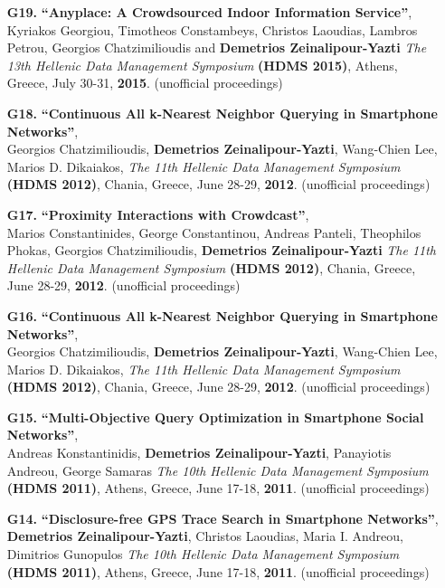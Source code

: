\documentclass[10pt]{article}
\begin{document}
\begin{enumerate}
\item[{\bf G19.}]
\label{G19}
{\bf ``Anyplace: A Crowdsourced Indoor Information Service''}, \\
Kyriakos Georgiou, Timotheos Constambeys, Christos Laoudias, Lambros Petrou, Georgios Chatzimilioudis and  {\bf Demetrios Zeinalipour-Yazti}
{\em The 13th Hellenic Data Management Symposium} {\bf (HDMS 2015)},
Athens, Greece, July 30-31, {\bf 2015}. (unofficial proceedings)

\item [{\bf G18.}]
\label{G18}
{\bf ``Continuous All k-Nearest Neighbor Querying in Smartphone Networks''}, \\
Georgios Chatzimilioudis, {\bf Demetrios Zeinalipour-Yazti}, Wang-Chien Lee, Marios D. Dikaiakos,
{\em The 11th Hellenic Data Management Symposium} {\bf (HDMS 2012)}, 
Chania, Greece, June 28-29, {\bf 2012}. (unofficial proceedings)

\item [{\bf G17.}]
\label{G17}
{\bf ``Proximity Interactions with Crowdcast''}, \\
Marios Constantinides, George Constantinou, Andreas Panteli, Theophilos Phokas, Georgios Chatzimilioudis, {\bf Demetrios Zeinalipour-Yazti}
{\em The 11th Hellenic Data Management Symposium} {\bf (HDMS 2012)}, 
Chania, Greece, June 28-29, {\bf 2012}. (unofficial proceedings)

\item [{\bf G16.}]
\label{G16}
{\bf ``Continuous All k-Nearest Neighbor Querying in Smartphone Networks''}, \\
Georgios Chatzimilioudis, {\bf Demetrios Zeinalipour-Yazti}, Wang-Chien Lee, Marios D. Dikaiakos,
{\em The 11th Hellenic Data Management Symposium} {\bf (HDMS 2012)}, 
Chania, Greece, June 28-29, {\bf 2012}. (unofficial proceedings)

\item [{\bf G15.}]
\label{G15}
{\bf ``Multi-Objective Query Optimization in Smartphone Social Networks''}, \\
Andreas Konstantinidis, {\bf Demetrios Zeinalipour-Yazti}, Panayiotis Andreou, George Samaras 
{\em The 10th Hellenic Data Management Symposium} {\bf (HDMS 2011)}, 
Athens, Greece, June 17-18, {\bf 2011}. (unofficial proceedings)

\item [{\bf G14.}]
\label{G14}
{\bf ``Disclosure-free GPS Trace Search in Smartphone Networks''}, \\
{\bf Demetrios Zeinalipour-Yazti}, Christos Laoudias, Maria I. Andreou, Dimitrios Gunopulos 
{\em The 10th Hellenic Data Management Symposium} {\bf (HDMS 2011)}, 
Athens, Greece, June 17-18, {\bf 2011}. (unofficial proceedings)


\end{enumerate}
\end{document}
